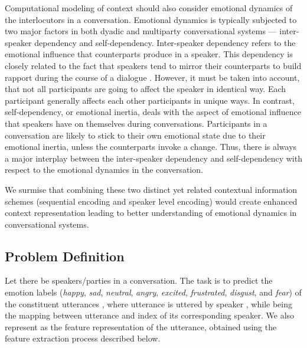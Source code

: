 \documentclass[11pt,a4paper]{article}
\begin{document}
Computational modeling of context should also consider emotional dynamics of the interlocutors in a conversation. Emotional dynamics is typically subjected to two major factors in both dyadic and multiparty conversational systems --- inter-speaker dependency and self-dependency. Inter-speaker dependency refers to the emotional influence that counterparts produce in a speaker. This dependency is closely related to the fact that speakers tend to mirror their counterparts to build rapport during the course of a dialogue \cite{navarretta2016mirroring}. However, it must be taken into account, that not all participants are going to affect the speaker in identical way. Each participant 
generally affects each
other participants in unique ways. In contrast, self-dependency, or emotional inertia, deals with the aspect of emotional influence that speakers have on themselves during conversations. Participants in a conversation are likely to stick to their own emotional state due to their emotional inertia, unless the counterparts invoke a change. Thus, there is always a major interplay between the inter-speaker dependency and self-dependency with respect to the emotional dynamics 
in the conversation.


We surmise that combining these two distinct yet related contextual information schemes (sequential encoding and speaker level encoding) would create enhanced context representation leading to better understanding of emotional dynamics in conversational systems.
\subsection{Problem Definition}
\label{sec:problem-definition}
Let there be  speakers/parties  
in a conversation. 
The task is to predict the emotion labels (\textit{happy}, \textit{sad}, \textit{neutral}, \textit{angry}, \textit{excited}, \textit{frustrated}, \textit{disgust}, and \textit{fear}) of the constituent utterances , where utterance  is uttered by speaker ,
while  being the mapping between utterance and index of its corresponding speaker. 
We also represent  as the feature representation of the utterance,
obtained using the feature extraction process described below.
\end{document}
